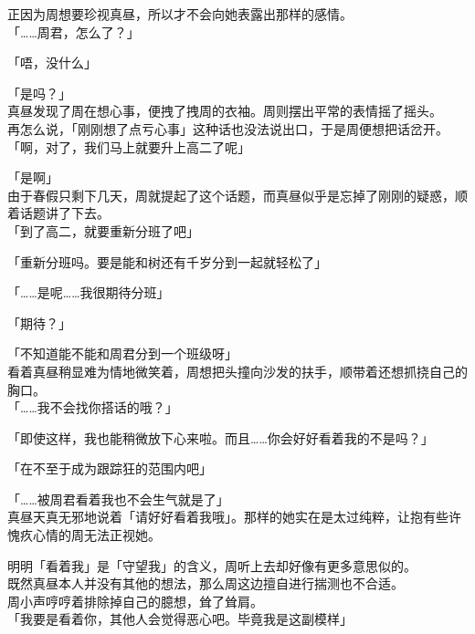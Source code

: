 正因为周想要珍视真昼，所以才不会向她表露出那样的感情。\\

「……周君，怎么了？」

「唔，没什么」

「是吗？」\\

真昼发现了周在想心事，便拽了拽周的衣袖。周则摆出平常的表情摇了摇头。\\

再怎么说，「刚刚想了点亏心事」这种话也没法说出口，于是周便想把话岔开。\\

「啊，对了，我们马上就要升上高二了呢」

「是啊」\\

由于春假只剩下几天，周就提起了这个话题，而真昼似乎是忘掉了刚刚的疑惑，顺着话题讲了下去。\\

「到了高二，就要重新分班了吧」

「重新分班吗。要是能和树还有千岁分到一起就轻松了」

「……是呢……我很期待分班」

「期待？」

「不知道能不能和周君分到一个班级呀」\\

看着真昼稍显难为情地微笑着，周想把头撞向沙发的扶手，顺带着还想抓挠自己的胸口。\\

「……我不会找你搭话的哦？」

「即使这样，我也能稍微放下心来啦。而且……你会好好看着我的不是吗？」

「在不至于成为跟踪狂的范围内吧」

「……被周君看着我也不会生气就是了」\\

真昼天真无邪地说着「请好好看着我哦」。那样的她实在是太过纯粹，让抱有些许愧疚心情的周无法正视她。

明明「看着我」是「守望我」的含义，周听上去却好像有更多意思似的。\\

既然真昼本人并没有其他的想法，那么周这边擅自进行揣测也不合适。\\

周小声哼哼着排除掉自己的臆想，耸了耸肩。\\

「我要是看着你，其他人会觉得恶心吧。毕竟我是这副模样」\\

